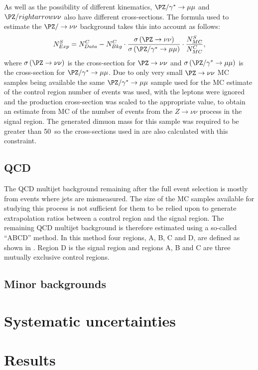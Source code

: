 As well as the possibility of different kinematics, $\PZ/\gamma^{*}\rightarrow\mu\mu$ and $\PZ/rightarrow\nu\nu$ also have different cross-sections. The formula used to estimate the $\PZ/\rightarrow\nu\nu$ background takes this into account as follows:
\begin{equation}
  \label{eq:zdatabkg}
  N^{S}_{Exp}=N^{C}_{Data}-N^{C}_{Bkg}\cdot\frac{\sigma\left(\PZ\rightarrow\nu\nu\right)}{\sigma\left(\PZ/\gamma^{*}\rightarrow\mu\mu\right)}\cdot\frac{N^{S}_{MC}}{N^{C}_{MC}},
\end{equation}
where $\sigma\left(\PZ\rightarrow\nu\nu\right)$ is the cross-section for $\PZ\rightarrow\nu\nu$ and $\sigma\left(\PZ/\gamma^{*}\rightarrow\mu\mu\right)$ is the cross-section for $\PZ/\gamma^{*}\rightarrow\mu\mu$. Due to only very small $\PZ\rightarrow\nu\nu$ \ac{MC} samples being available the same $\PZ/\gamma^{*}\rightarrow\mu\mu$ sample used for the \ac{MC} estimate of the control region number of events was used, with the leptons were ignored and the production cross-section was scaled to the appropriate value, to obtain an estimate from \ac{MC} of the number of events from the $Z\rightarrow\nu\nu$ process in the signal region. The generated dimuon mass for this sample was required to be greater than 50 \GeV\,so the cross-sections used in  are also calculated with this constraint.


\subsection{QCD}%
\label{sec:prompt\ac{QCD}}
The \ac{QCD} multijet background remaining after the full event selection is mostly from events where jets are mismeasured. The size of the \ac{MC} samples available for studying this process is not sufficient for them to be relied upon to generate extrapolation ratios between a control region and the signal region. The remaining \ac{QCD} multijet background is therefore estimated using a so-called ``ABCD'' method. In this method four regions, A, B, C and D, are defined as shown in . Region D is the signal region and regions A, B and C are three mutually exclusive control regions.
\begin{figure}
  \caption{}%
  \label{fig:abcdmethod}
\end{figure}
\subsection{Minor backgrounds}%
\label{sec:promptminor}

\section{Systematic uncertainties}%
\label{sec:promptsyst}

\section{Results}%
\label{sec:promptresults}

